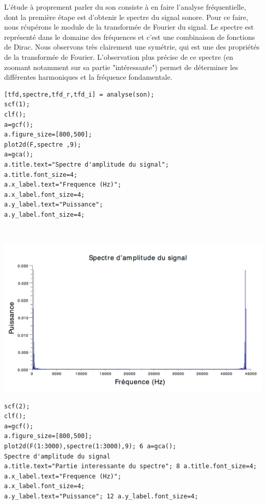 \documentclass[a4paper,12pt]{report}
\begin{document}
\begin{enumerate}
	L'\'etude \`a proprement parler du son consiste \`a en faire l'analyse fr\'equentielle, dont la premi\`ere \'etape est d'obtenir le spectre du signal sonore. Pour ce faire, nous r\'cup\'erons le module de la transform\'ee de Fourier du signal. Le spectre est repr\'esent\'e dans le domaine des fr\'equences et c'est une combinaison de fonctions de Dirac. Nous observons tr\`es clairement une sym\'etrie, qui est une des propri\'et\'es de la transform\'ee de Fourier. L'observation plus pr\'ecise de ce spectre (en zoomant notamment sur sa partie "int\'eressante") permet de d\'eterminer les diff\'erentes harmoniques et la fr\'equence fondamentale.\\	
\begin{lstlisting}	
[tfd,spectre,tfd_r,tfd_i] = analyse(son); 
scf(1);
clf();
a=gcf();
a.figure_size=[800,500];
plot2d(F,spectre ,9);
a=gca();
a.title.text="Spectre d'amplitude du signal";
a.title.font_size=4;
a.x_label.text="Frequence (Hz)";
a.x_label.font_size=4;
a.y_label.text="Puissance";
a.y_label.font_size=4;
\end{lstlisting}\\
	\begin{center}
		\includegraphics[scale=0.5]{GuitareFreq1.png}\\
	\end{center}
	\newpage
\begin{lstlisting}	
scf(2);
clf();
a=gcf();
a.figure_size=[800,500];
plot2d(F(1:3000),spectre(1:3000),9); 6 a=gca();
Spectre d'amplitude du signal
a.title.text="Partie interessante du spectre"; 8 a.title.font_size=4;
a.x_label.text="Frequence (Hz)";
a.x_label.font_size=4;
a.y_label.text="Puissance"; 12 a.y_label.font_size=4;	
\end{lstlisting}
	\begin{center}

\end{center}
\end{enumerate}
\end{document}

